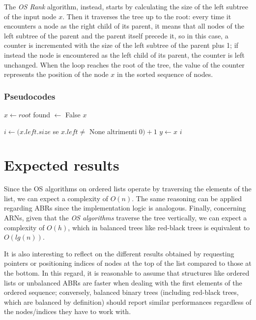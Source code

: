 \documentclass[11pt]{article}
\begin{document}
The \textit{OS Rank} algorithm, instead, starts by calculating the size of the left subtree of the input node \( x \). Then it traverses the tree up to the root: every time it encounters a node as the right child of its parent, it means that all nodes of the left subtree of the parent and the parent itself precede it, so in this case, a counter is incremented with the size of the left subtree of the parent plus 1; if instead the node is encountered as the left child of its parent, the counter is left unchanged. When the loop reaches the root of the tree, the value of the counter represents the position of the node \( x \) in the sorted sequence of nodes.

\subsubsection{Pseudocodes}
\begin{algorithm}[H]
\SetAlgoLined
{}
$x \leftarrow root$\;
found $\leftarrow$ False\;
\Return $x$\;
\end{algorithm}
\begin{algorithm}[H]
\SetAlgoLined
{}
$i \leftarrow (x.left.size$ se $x.left \neq$ None altrimenti $0) + 1$\;
$y \leftarrow x$\;
\Return $i$\;
\end{algorithm}

\section{Expected results}
Since the OS algorithms on ordered lists operate by traversing the elements of the list, we can expect a complexity of $O(n)$. The same reasoning can be applied regarding ABRs since the implementation logic is analogous. Finally, concerning ARNs, given that the \textit{OS algorithms} traverse the tree vertically, we can expect a complexity of $O(h)$, which in balanced trees like red-black trees is equivalent to $O(lg(n))$.

It is also interesting to reflect on the different results obtained by requesting pointers or positioning indices of nodes at the top of the list compared to those at the bottom. In this regard, it is reasonable to assume that structures like ordered lists or unbalanced ABRs are faster when dealing with the first elements of the ordered sequence; conversely, balanced binary trees (including red-black trees, which are balanced by definition) should report similar performances regardless of the nodes/indices they have to work with.
\end{document}
